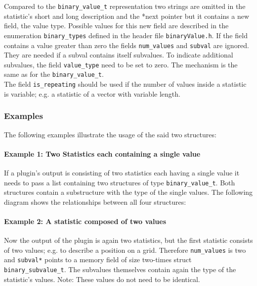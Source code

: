 \documentclass[documentation]{subfiles}
\begin{document}
Compared to the {\tt binary\_value\_t} representation two strings are omitted in the statistic's short and long description and the *next pointer but it contains a new field, the value type. Possible values for this new field are described in the enumeration {\tt binary\_types} defined in the header file {\tt binaryValue.h}. If the field contains a value greater than zero the fields {\tt num\_values} and {\tt subval} are ignored. They are needed if a subval contains itself subvalues. To indicate additional subvalues, the field {\tt value\_type} need to be set to zero. The mechanism is the same as for the {\tt binary\_value\_t}.\\[2ex]
The field {\tt is\_repeating} should be used if the number of values inside a statistic is variable; e.g. a statistic of a vector with variable length.

\subsubsection{Examples}
The following examples illustrate the usage of the said two structures:
\paragraph{Example 1: Two Statistics each containing a single value}
If a plugin's output is consisting of two statistics each having a single value it needs to pass a list containing two structures of type {\tt binary\_value\_t}. Both structures contain a substructure with the type of the single values. The following diagram shows the relationships between all four structures:
\begin{figure}[H]
    \centering
\end{figure}

\paragraph{Example 2: A statistic composed of two values}
Now the output of the plugin is again two statistics, but the first statistic consists of two values; e.g. to describe a position on a grid. Therefore {\tt num\_values} is two and {\tt subval*} points to a memory field of size two-times struct {\tt binary\_subvalue\_t}. The subvalues themselves contain again the type of the statistic's values. Note: These values do not need to be identical.
\begin{figure}[H]
    \centering
\end{figure}
\end{document}
